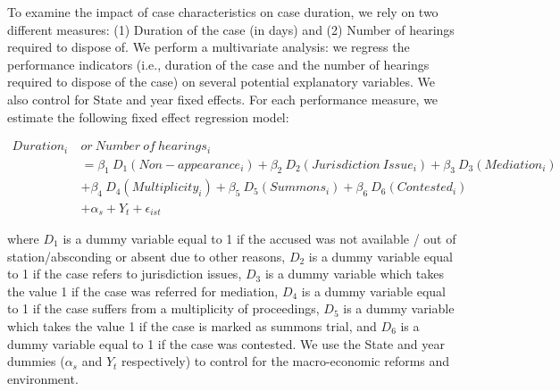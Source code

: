 To examine the impact of case characteristics on case duration, we rely on two different measures: (1) Duration of the case (in days) and (2) Number of hearings required to dispose of. We perform a multivariate analysis: we regress the performance indicators (i.e., duration of the case and the number of hearings required to dispose of the case) on several potential explanatory variables. We also control for State and year fixed effects. For each performance measure, we estimate the following fixed effect regression model:

\begin{equation}\label{eq:fe1}
\begin{split}
Duration_i \ & or \ Number \ of \ hearings_i \\
& = \beta_1 \ D_1(Non-appearance_i) + \beta_2 \ D_2(Jurisdiction \ Issue_i) + \beta_3 \ D_3(Mediation_i) \\
& + \beta_4 \ D_4(Multiplicity_i) + \beta_5 \ D_5(Summons_i) + \beta_6 \ D_6(Contested_i) \\
&  + \alpha_s + Y_t + \epsilon_{ist}
\end{split}
\end{equation}

where $D_1$ is a dummy variable equal to 1 if the accused was not available / out of station/absconding or absent due to other reasons, $D_2$ is a dummy variable equal to 1 if the case refers to jurisdiction issues, $D_3$ is a dummy variable which takes the value 1 if the case was referred for mediation, $D_4$ is a dummy variable equal to 1 if the case suffers from a multiplicity of proceedings, $D_5$ is a dummy variable which takes the value 1 if the case is marked as summons trial, and $D_6$ is a dummy variable equal to 1 if the case was contested. We use the State and year dummies ($\alpha_s$ and $Y_t$ respectively) to control for the macro-economic reforms and environment.


